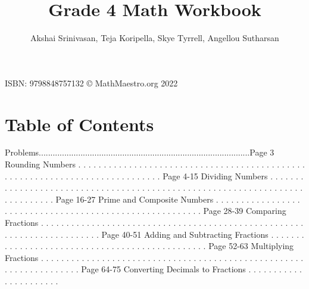 \documentclass{article}%
\title{Grade 4 Math Workbook}%
\author{Akshai Srinivasan, Teja Koripella, Skye Tyrrell, Angellou Sutharsan}%
\date{}%
\begin{document}
%
\normalsize%
\maketitle%
\vfill%
\begin{center}%
ISBN: 9798848757132%
\linebreak%
\copyright%
MathMaestro.org 2022%
\end{center}%
\newpage%
\section{Table of Contents}%
\label{sec:TableofContents}%
Problems...........................................................................................Page 3%
\newline%
Rounding Numbers%
.%
.%
.%
.%
.%
.%
.%
.%
.%
.%
.%
.%
.%
.%
.%
.%
.%
.%
.%
.%
.%
.%
.%
.%
.%
.%
.%
.%
.%
.%
.%
.%
.%
.%
.%
.%
.%
.%
.%
.%
.%
.%
.%
.%
.%
.%
.%
.%
.%
.%
.%
.%
.%
.%
.%
.%
.%
.%
.%
.%
.%
.%
.%
.%
.%
.%
.%
.%
.%
.%
.%
.%
.%
.%
.%
.%
Page 4{-}15%
\newline%
Dividing Numbers%
.%
.%
.%
.%
.%
.%
.%
.%
.%
.%
.%
.%
.%
.%
.%
.%
.%
.%
.%
.%
.%
.%
.%
.%
.%
.%
.%
.%
.%
.%
.%
.%
.%
.%
.%
.%
.%
.%
.%
.%
.%
.%
.%
.%
.%
.%
.%
.%
.%
.%
.%
.%
.%
.%
.%
.%
.%
.%
.%
.%
.%
.%
.%
.%
.%
.%
.%
.%
.%
.%
.%
.%
.%
.%
.%
.%
Page 16{-}27%
\newline%
Prime and Composite Numbers%
.%
.%
.%
.%
.%
.%
.%
.%
.%
.%
.%
.%
.%
.%
.%
.%
.%
.%
.%
.%
.%
.%
.%
.%
.%
.%
.%
.%
.%
.%
.%
.%
.%
.%
.%
.%
.%
.%
.%
.%
.%
.%
.%
.%
.%
.%
.%
.%
.%
.%
.%
.%
.%
.%
.%
.%
Page 28{-}39%
\newline%
Comparing Fractions%
.%
.%
.%
.%
.%
.%
.%
.%
.%
.%
.%
.%
.%
.%
.%
.%
.%
.%
.%
.%
.%
.%
.%
.%
.%
.%
.%
.%
.%
.%
.%
.%
.%
.%
.%
.%
.%
.%
.%
.%
.%
.%
.%
.%
.%
.%
.%
.%
.%
.%
.%
.%
.%
.%
.%
.%
.%
.%
.%
.%
.%
.%
.%
.%
.%
.%
.%
.%
.%
.%
.%
Page 40{-}51%
\newline%
Adding and Subtracting Fractions%
.%
.%
.%
.%
.%
.%
.%
.%
.%
.%
.%
.%
.%
.%
.%
.%
.%
.%
.%
.%
.%
.%
.%
.%
.%
.%
.%
.%
.%
.%
.%
.%
.%
.%
.%
.%
.%
.%
.%
.%
.%
.%
.%
.%
.%
.%
.%
Page 52{-}63%
\newline%
Multiplying Fractions%
.%
.%
.%
.%
.%
.%
.%
.%
.%
.%
.%
.%
.%
.%
.%
.%
.%
.%
.%
.%
.%
.%
.%
.%
.%
.%
.%
.%
.%
.%
.%
.%
.%
.%
.%
.%
.%
.%
.%
.%
.%
.%
.%
.%
.%
.%
.%
.%
.%
.%
.%
.%
.%
.%
.%
.%
.%
.%
.%
.%
.%
.%
.%
.%
.%
.%
.%
Page 64{-}75%
\newline%
Converting Decimals to Fractions%
.%
.%
.%
.%
.%
.%
.%
.%
.%
.%
.%
.%
.%
.%
.%
.%
.%
.%
.%
.%
.%
.%
\end{document}
